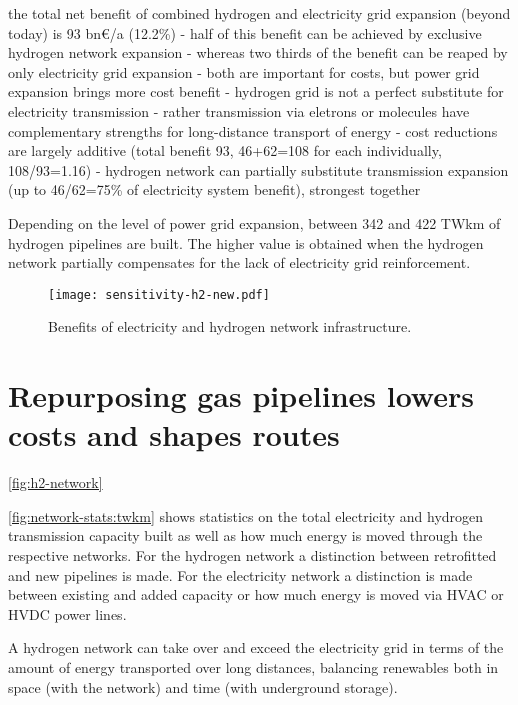 
the total net benefit of combined hydrogen and electricity grid expansion (beyond today) is 93 bn\euro/a (12.2\%)
- half of this benefit can be achieved by exclusive hydrogen network expansion
- whereas two thirds of the benefit can be reaped by only electricity grid expansion
- both are important for costs, but power grid expansion brings more cost benefit
- hydrogen grid is not a perfect substitute for electricity transmission
- rather transmission via eletrons or molecules have complementary strengths for long-distance transport of energy
- cost reductions are largely additive (total benefit 93, 46+62=108 for each individually, 108/93=1.16)
- hydrogen network can partially substitute transmission expansion (up to 46/62=75\% of electricity system benefit), strongest together

Depending on the level of power grid expansion, between 342 and 422 TWkm of
hydrogen pipelines are built. The higher value is obtained when the hydrogen
network partially compensates for the lack of electricity grid reinforcement.

\begin{SCfigure}
    \centering
    \texttt{[image: sensitivity-h2-new.pdf]}
    \caption{Benefits of electricity and hydrogen network infrastructure.}
    \label{fig:sensitivity-h2}
\end{SCfigure}


\section*{Repurposing gas pipelines lowers costs and shapes routes}
\label{sec:repurposed}


\cref{fig:h2-network}


\cref{fig:network-stats:twkm} shows statistics on the total electricity and
hydrogen transmission capacity built as well as how much energy is moved through
the respective networks. For the hydrogen network a distinction between
retrofitted and new pipelines is made. For the electricity network a distinction
is made between existing and added capacity or how much energy is moved via HVAC
or HVDC power lines.

A hydrogen network can take over and exceed the electricity grid
in terms of the amount of energy transported over long distances, balancing
renewables both in space (with the network) and time (with underground storage).

